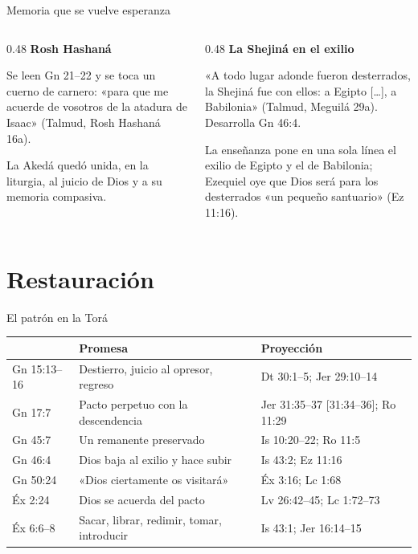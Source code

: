 \documentclass[hyperref={bookmarks=false},aspectratio=169]{beamer}
\newcommand{\notafig}[1]{\par\vspace{2pt}{\fontsize{5}{6}\selectfont\color{sepia}\hfill\textit{Nota.} #1\par}}
\newcommand{\elabpropia}{\notafig{Elaboración propia.}}
\begin{document}
\begin{frame}{Memoria que se vuelve esperanza}
\begin{columns}[T,onlytextwidth]
\begin{column}{0.48\textwidth}\small
\textbf{\textcolor{ladrillo}{Rosh Hashaná}}\par\smallskip
Se leen Gn 21--22 y se toca un cuerno de carnero: «para que me acuerde de vosotros de la atadura de Isaac» (Talmud, Rosh Hashaná 16a).\par\medskip
\begin{clave}
La Akedá quedó unida, en la liturgia, al juicio de Dios y a su memoria compasiva.
\end{clave}
\end{column}
\begin{column}{0.48\textwidth}\small
\textbf{\textcolor{ladrillo}{La Shejiná en el exilio}}\par\smallskip
«A todo lugar adonde fueron desterrados, la Shejiná fue con ellos: a Egipto [\ldots], a Babilonia» (Talmud, Meguilá 29a). Desarrolla Gn 46:4.\par\medskip
\begin{notalam}
La enseñanza pone en una sola línea el exilio de Egipto y el de Babilonia; Ezequiel oye que Dios será para los desterrados «un pequeño santuario» (Ez 11:16).
\end{notalam}
\end{column}
\end{columns}
\end{frame}

\section{Restauración}
\begin{frame}{El patrón en la Torá}
\centering\footnotesize\renewcommand{\arraystretch}{1.25}
\begin{tabular}{>{\RaggedRight\arraybackslash}p{2.0cm}>{\RaggedRight\arraybackslash}p{4.9cm}>{\RaggedRight\arraybackslash}p{4.7cm}}
\toprule
{\leavevmode\color{ladrillo}\bfseries Texto} & {\leavevmode\color{ladrillo}\bfseries Promesa} & {\leavevmode\color{ladrillo}\bfseries Proyección}\\\midrule
Gn 15:13--16 & Destierro, juicio al opresor, regreso & Dt 30:1--5; Jer 29:10--14\\
Gn 17:7 & Pacto perpetuo con la descendencia & Jer 31:35--37 [31:34--36]; Ro 11:29\\
Gn 45:7 & Un remanente preservado & Is 10:20--22; Ro 11:5\\
Gn 46:4 & Dios baja al exilio y hace subir & Is 43:2; Ez 11:16\\
Gn 50:24 & «Dios ciertamente os visitará» & Éx 3:16; Lc 1:68\\
Éx 2:24 & Dios se acuerda del pacto & Lv 26:42--45; Lc 1:72--73\\
Éx 6:6--8 & Sacar, librar, redimir, tomar, introducir & Is 43:1; Jer 16:14--15\\
\bottomrule
\end{tabular}
\elabpropia
\end{frame}
\end{document}
